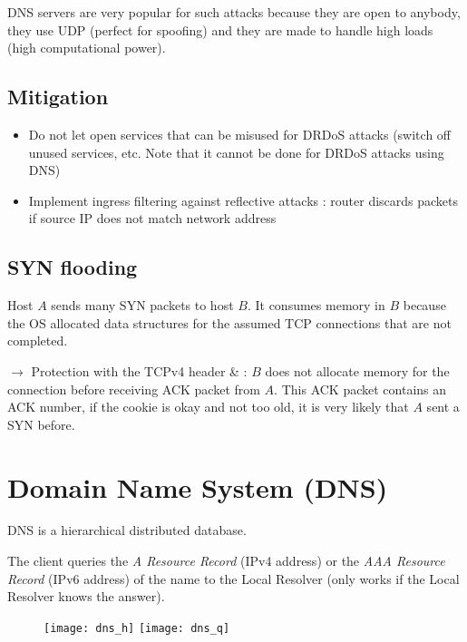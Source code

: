 DNS servers are very popular for such attacks because they are open to anybody, they use UDP (perfect for spoofing) and they are made to handle high loads (high computational power).

\section{Mitigation}

\begin{itemize}
    \item Do not let open services that can be misused for DRDoS attacks (switch off unused services, etc. Note that it cannot be done for DRDoS attacks using DNS)
    \item Implement ingress filtering against reflective attacks : router discards packets if source IP does not match network address
\end{itemize}

\section{SYN flooding}

Host $A$ sends many SYN packets to host $B$. It consumes memory in $B$ because the OS allocated data structures for the assumed TCP connections that are not completed. 

$\rightarrow$ Protection with the TCPv4 header \&  : $B$ does not allocate memory for the connection before receiving ACK packet from $A$. This ACK packet contains an ACK number, if the cookie is okay and not too old, it is very likely that $A$ sent a SYN before.

\chapter{Domain Name System (DNS)}

DNS is a hierarchical distributed database.

The client queries the \textit{A Resource Record} (IPv4 address) or the \textit{AAA Resource Record} (IPv6 address) of the name to the Local Resolver (only works if the Local Resolver knows the answer).

\begin{figure}[H]
    \centering
    \texttt{[image: dns\_h]}\hfill
    \texttt{[image: dns\_q]}
\end{figure}

